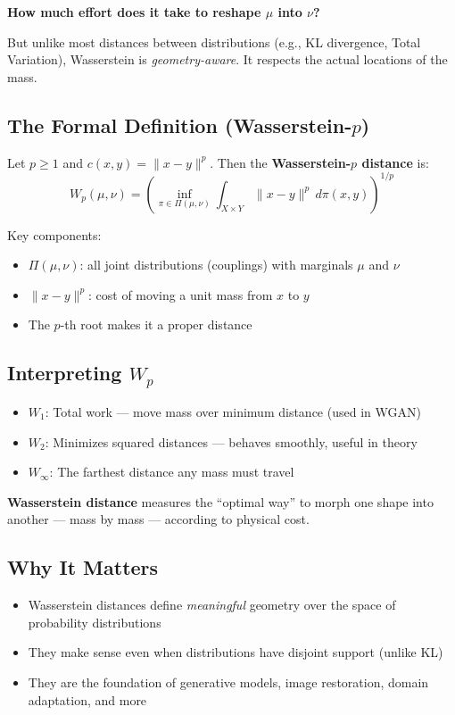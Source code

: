 \documentclass[11pt]{article}
\begin{document}
\begin{highlight}
\textbf{How much effort does it take to reshape $\mu$ into $\nu$?}
\end{highlight}

But unlike most distances between distributions (e.g., KL divergence, Total Variation), Wasserstein is \emph{geometry-aware}. It respects the actual locations of the mass.

\subsection*{The Formal Definition (Wasserstein-$p$)}
Let $p \geq 1$ and $c(x,y) = \|x - y\|^p$. Then the \textbf{Wasserstein-$p$ distance} is:
\[
W_p(\mu, \nu) = \left( \inf_{\pi \in \Pi(\mu, \nu)} \int_{X \times Y} \|x - y\|^p \, d\pi(x, y) \right)^{1/p}
\]

Key components:
\begin{itemize}
  \item $\Pi(\mu, \nu)$: all joint distributions (couplings) with marginals $\mu$ and $\nu$
  \item $\|x - y\|^p$: cost of moving a unit mass from $x$ to $y$
  \item The $p$-th root makes it a proper distance
\end{itemize}

\subsection*{Interpreting $W_p$}
\begin{itemize}
  \item $W_1$: Total work — move mass over minimum distance (used in WGAN)
  \item $W_2$: Minimizes squared distances — behaves smoothly, useful in theory
  \item $W_\infty$: The farthest distance any mass must travel
\end{itemize}

\begin{tcolorbox}[colback=white, colframe=blue!50!black, title=Geometric Meaning]
\textbf{Wasserstein distance} measures the ``optimal way'' to morph one shape into another — mass by mass — according to physical cost.
\end{tcolorbox}

\subsection*{Why It Matters}
\begin{itemize}
  \item Wasserstein distances define \emph{meaningful} geometry over the space of probability distributions
  \item They make sense even when distributions have disjoint support (unlike KL)
  \item They are the foundation of generative models, image restoration, domain adaptation, and more
\end{itemize}
\end{document}
